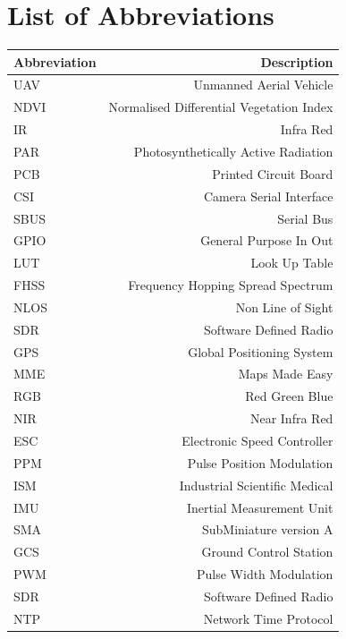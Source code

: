 \chapter{List of Abbreviations}
\begin{table}[H]
\centering
\begin{tabular}{l|r}
Abbreviation & Description \\\hline
UAV & Unmanned Aerial Vehicle \\
NDVI & Normalised Differential Vegetation Index\\
IR & Infra Red\\
PAR & Photosynthetically Active Radiation\\
PCB & Printed Circuit Board\\
CSI & Camera Serial Interface\\
SBUS & Serial Bus\\
GPIO & General Purpose In Out\\
LUT & Look Up Table\\
FHSS & Frequency Hopping Spread Spectrum\\
NLOS & Non Line of Sight\\
SDR & Software Defined Radio\\
GPS & Global Positioning System\\
MME & Maps Made Easy\\
RGB & Red Green Blue\\
NIR & Near Infra Red\\
ESC & Electronic Speed Controller\\
PPM & Pulse Position Modulation\\
ISM & Industrial Scientific Medical\\
IMU & Inertial Measurement Unit\\
SMA & SubMiniature version A\\
GCS & Ground Control Station\\
PWM & Pulse Width Modulation\\
SDR & Software Defined Radio\\
NTP & Network Time Protocol\\


\end{tabular}
\end{table}

%

